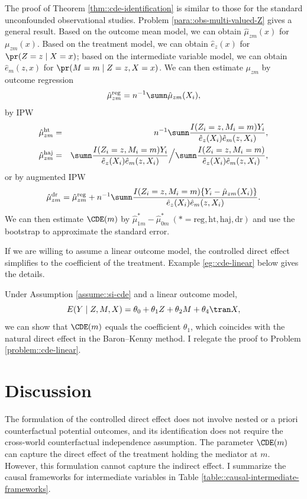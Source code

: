 The proof of Theorem \ref{thm::cde-identification} is similar to those for the standard unconfounded observational studies. Problem \ref{para::obs-multi-valued-Z} gives a general result. 
Based on the outcome mean model, we can obtain $\hat{\mu}_{zm}(x) $ for $\mu_{zm}(x)$. Based on the treatment model, we can obtain $\hat{e}_z(x)$ for $\pr(Z=z\mid X = x)$; based on the intermediate variable model, we can obtain $\hat{e}_m(z,x)$ for $\pr(M=m\mid Z=z, X=x)$. We can then estimate $\mu_{zm} $ by outcome regression
$$
\hat{\mu}_{zm}^\text{reg} = n^{-1} \sumn  \hat{\mu}_{zm}(X_i),
$$
by IPW 
\begin{eqnarray*}
\hat{\mu}_{zm}^\text{ht} &=& n^{-1}\sumn  \frac{  I(Z_i=z, M_i=m) Y_i  }{  \hat{e}_z(X_i)  \hat{e}_m(z,X_i)  } , \\
\hat{\mu}_{zm}^\text{haj} &=&  \sumn  \frac{  I(Z_i=z, M_i=m) Y_i  }{  \hat{e}_z(X_i)  \hat{e}_m(z,X_i)  } \Big /  \sumn  \frac{  I(Z_i=z, M_i=m)    }{  \hat{e}_z(X_i)  \hat{e}_m(z,X_i)  }, 
\end{eqnarray*}
or by augmented IPW
$$
\hat{\mu}_{zm}^\text{dr} = \hat{\mu}_{zm}^\text{reg}  +  n^{-1} \sumn  \frac{  I(Z_i=z, M_i=m) \{ Y_i - \hat{\mu}_{zm}(X_i)\}   }{  \hat{e}_z(X_i)  \hat{e}_m(z,X_i)  } .
$$
We can then estimate $\CDE(m)$ by $\hat{\mu}_{1m}^* - \hat{\mu}_{0m}^*\ (*=\text{reg}, \text{ht}, \text{haj}, \text{dr} )$  and use the bootstrap to approximate the standard error. 




If we are willing to assume a linear outcome model, the controlled direct effect simplifies to the coefficient of the treatment. Example \ref{eg::cde-linear} below gives the details. 
\begin{example}
\label{eg::cde-linear}
Under Assumption \ref{assume::si-cde} and a linear outcome model,
$$
E(Y\mid Z,M,X) = \theta_0 + \theta_1 Z + \theta_2 M +   \theta_4\tran X,
$$
we can show that
$
\CDE(m) 
$
equals the coefficient $ \theta_1$, which coincides with the natural direct effect in the Baron--Kenny method. I relegate the proof to Problem \ref{problem::cde-linear}. 
\end{example}







\section{Discussion}

The formulation of the controlled direct effect does not involve nested or a priori counterfactual potential outcomes, and its identification does not require the cross-world counterfactual independence assumption. The parameter $\CDE(m)$ can capture the direct effect of the treatment holding the mediator at $m$. However, this formulation cannot capture the indirect effect.  
I summarize the causal frameworks for intermediate variables in Table \ref{table::causal-intermediate-frameworks}. 
 
